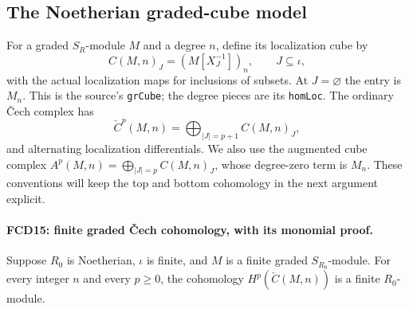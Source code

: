 \documentclass[11pt,a4paper]{article}
\numberwithin{equation}{section}
\theoremstyle{remark}\newtheorem{remark}[theorem]{Remark}
\begin{document}
\subsection{The Noetherian graded-cube model}

For a graded $S_R$-module $M$ and a degree $n$, define its
localization cube by
\[
 C(M,n)_J=(M[X_J^{-1}])_n,\qquad J\subseteq\iota,    \tag{FCD.15}\label{FCD.15}
\]
with the actual localization maps for inclusions of subsets.  At
$J=\varnothing$ the entry is $M_n$.  This is the source's
\texttt{gr\allowbreak Cube}; the degree pieces are its \texttt{hom\allowbreak Loc}.
The ordinary \v Cech complex has
\[
 \check C^p(M,n)=\bigoplus_{|J|=p+1}C(M,n)_J,
\]
and alternating localization differentials.  We also use the
augmented cube complex $A^p(M,n)=\bigoplus_{|J|=p}C(M,n)_J$,
whose degree-zero term is $M_n$.  These conventions will keep the
top and bottom cohomology in the next argument explicit.

\paragraph{FCD15: finite graded \v Cech cohomology, with its monomial proof.}
\label{claim:FCD15}
Suppose $R_0$ is Noetherian, $\iota$ is finite, and $M$ is a
finite graded $S_{R_0}$-module.  For every integer $n$ and
every $p\ge0$, the cohomology $H^p(\check C(M,n))$ is a finite
$R_0$-module.
\end{document}
